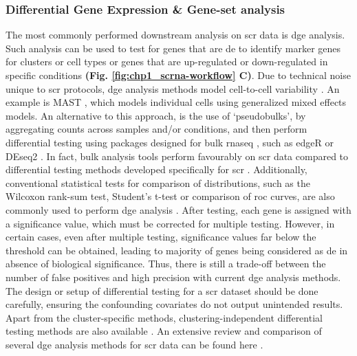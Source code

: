 \subsubsection{Differential Gene Expression \& Gene-set analysis}
The most commonly performed downstream analysis on \gls{scr} data is \gls{dge} analysis. Such analysis can be used to test for genes that are \gls{de} to identify marker genes for clusters or cell types or genes that are up-regulated or down-regulated in specific conditions \textbf{(Fig. \ref{fig:chp1_scrna-workflow} C)}. %
Due to technical noise unique to \gls{scr} protocols, \gls{dge} analysis methods model cell-to-cell variability \textbf{\cite{das_comprehensive_2021}}. An example is MAST \textbf{\cite{finak_mast_2015}}, which models individual cells using generalized mixed effects models. An alternative to this approach, is the use of `pseudobulks’, by aggregating counts across samples and/or conditions, and then perform differential testing using packages designed for bulk \gls{rnaseq} \textbf{\cite{lueckenmalte_d_current_2019,heumos_best_2023}}, such as edgeR \textbf{\cite{robinson_edger_2009}} or DEseq2 \textbf{\cite{love_moderated_2014}}. In fact, bulk analysis tools perform favourably on \gls{scr} data compared to differential testing methods developed specifically for \gls{scr} \textbf{\cite{das_comprehensive_2021,squair_confronting_2021,van_den_berge_observation_2018,soneson_bias_2018}}. Additionally, conventional statistical tests for comparison of distributions, such as the Wilcoxon rank-sum test, Student's t-test or comparison of \gls{roc} curves, are also commonly used to perform \gls{dge} analysis \textbf{\cite{butler_integrating_2018}}. After testing, each gene is assigned with a significance value, which must be corrected for multiple testing. However, in certain cases, even after multiple testing, significance values far below the threshold can be obtained, leading to majority of genes being considered as \gls{de} in absence of biological significance. Thus, there is still a trade-off between the number of false positives and high precision with current \gls{dge} analysis methods. The design or setup of differential testing for a \gls{scr} dataset should be done carefully, ensuring the confounding covariates do not output unintended results. Apart from the cluster-specific methods, clustering-independent differential testing methods are also available \textbf{\cite{vandenbon_clustering-independent_2020,kim_marcopolo_2022,vlot_cluster-independent_2022}}. An extensive review and comparison of several \gls{dge} analysis methods for \gls{scr} data can be found here \textbf{\cite{das_comprehensive_2021,squair_confronting_2021,wang_comparative_2019,das_differential_2022,nguyen_benchmarking_2023}}.\\


